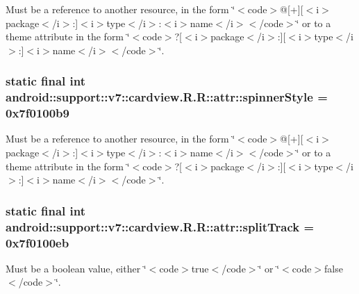 Must be a reference to another resource, in the form \char`\"{}$<$code$>$@\mbox{[}+\mbox{]}\mbox{[}$<$i$>$package$<$/i$>$:\mbox{]}$<$i$>$type$<$/i$>$:$<$i$>$name$<$/i$>$$<$/code$>$\char`\"{} or to a theme attribute in the form \char`\"{}$<$code$>$?\mbox{[}$<$i$>$package$<$/i$>$:\mbox{]}\mbox{[}$<$i$>$type$<$/i$>$:\mbox{]}$<$i$>$name$<$/i$>$$<$/code$>$\char`\"{}. \hypertarget{classandroid_1_1support_1_1v7_1_1cardview_1_1_r_1_1attr_9d8419ff35575db5c3c24d246fe1c397}{
\subsubsection[{spinnerStyle}]{\setlength{\rightskip}{0pt plus 5cm}static final int android::support::v7::cardview.R.R::attr::spinnerStyle = 0x7f0100b9}}
\label{classandroid_1_1support_1_1v7_1_1cardview_1_1_r_1_1attr_9d8419ff35575db5c3c24d246fe1c397}


Must be a reference to another resource, in the form \char`\"{}$<$code$>$@\mbox{[}+\mbox{]}\mbox{[}$<$i$>$package$<$/i$>$:\mbox{]}$<$i$>$type$<$/i$>$:$<$i$>$name$<$/i$>$$<$/code$>$\char`\"{} or to a theme attribute in the form \char`\"{}$<$code$>$?\mbox{[}$<$i$>$package$<$/i$>$:\mbox{]}\mbox{[}$<$i$>$type$<$/i$>$:\mbox{]}$<$i$>$name$<$/i$>$$<$/code$>$\char`\"{}. \hypertarget{classandroid_1_1support_1_1v7_1_1cardview_1_1_r_1_1attr_8ce90586ae27f4485583fc51cd185879}{
\subsubsection[{splitTrack}]{\setlength{\rightskip}{0pt plus 5cm}static final int android::support::v7::cardview.R.R::attr::splitTrack = 0x7f0100eb}}
\label{classandroid_1_1support_1_1v7_1_1cardview_1_1_r_1_1attr_8ce90586ae27f4485583fc51cd185879}


Must be a boolean value, either \char`\"{}$<$code$>$true$<$/code$>$\char`\"{} or \char`\"{}$<$code$>$false$<$/code$>$\char`\"{}. 

